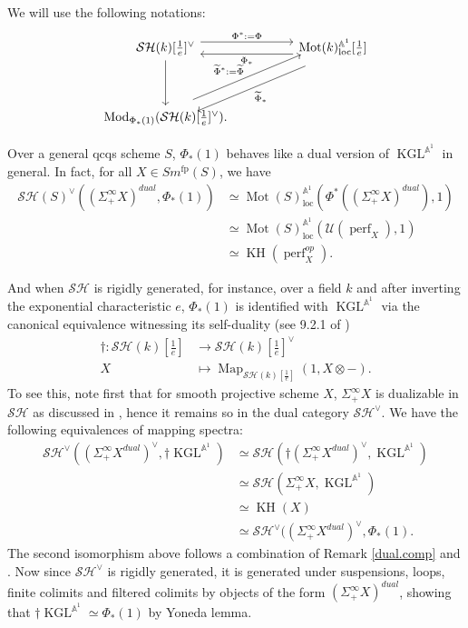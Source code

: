 \documentclass{article}
\theoremstyle{definition}
\newcommand{\on}{\operatorname}
\begin{document}
We will use the following notations:\[\begin{tikzcd}
	{\mathcal{SH}(k)[\frac{1}{e}]^{\vee}} && {\on{Mot}(k)_{\on{loc}}^{\mathbb{A}^1}[\frac{1}{e}]} \\
	\\
	{\on{Mod}_{\Phi_\ast(1)}(\mathcal{SH}(k)[\frac{1}{e}]^{\vee})}
	\arrow["{\Phi^\ast:=\Phi}", shift left=2, from=1-1, to=1-3]
	\arrow[from=1-1, to=3-1]
	\arrow["{\Phi_\ast}", shift left=2, from=1-3, to=1-1]
	\arrow["{\widetilde{\Phi}_\ast}", shift left=2, from=1-3, to=3-1]
	\arrow["{\widetilde{\Phi}^\ast:=\widetilde{\Phi}}", shift left=2, from=3-1, to=1-3].
\end{tikzcd}\]


Over a general qcqs scheme $S$, $\Phi_\ast(1)$ behaves like a dual version of $\on{KGL}^{\mathbb{A}^1}$ in general. In fact, for all $X\in Sm^{\on{fp}}(S)$, we have\[
\begin{aligned}
\mathcal{SH}(S)^{\vee}((\Sigma^\infty_+ X)^{dual},\Phi_\ast(1)) &\simeq \on{Mot}(S)_{\on{loc}}^{\mathbb{A}^1}(\Phi^\ast((\Sigma^\infty_+ X)^{dual}), 1)\\
&\simeq \on{Mot}(S)_{\on{loc}}^{\mathbb{A}^1}(\mathcal{U}(\on{perf}_X),1)\\
&\simeq\on{KH}(\on{perf}_X^{op}).
\end{aligned}\]


And when $\mathcal{SH}$ is rigidly generated, for instance, over a field $k$ and after inverting the exponential characteristic $e$, $\Phi_\ast(1)$ is identified with $\on{KGL}^{\mathbb{A}^1}$ via the canonical equivalence witnessing its self-duality (see 9.2.1 of \cite{GR})\[\begin{aligned}
\dagger:\mathcal{SH}(k)[\frac{1}{e}]&\rightarrow\mathcal{SH}(k)[\frac{1}{e}]^{\vee}\\
X&\mapsto\on{Map}_{\mathcal{SH}(k)[\frac{1}{e}]}(1,X\otimes-).
\end{aligned}
\]
To see this, note first that for smooth projective scheme $X$, $\Sigma^\infty_+X$ is dualizable in $\mathcal{SH}$ as discussed in \cite{Rio}, hence it remains so in the dual category $\mathcal{SH}^{\vee}$. We have the following equivalences of mapping spectra:
\[\begin{aligned}
\mathcal{SH}^\vee((\Sigma^\infty_+X^{dual})^\vee,\dagger\on{KGL}^{\mathbb{A}^1})&\simeq\mathcal{SH}(\dagger(\Sigma^\infty_+X^{dual})^\vee,\on{KGL}^{\mathbb{A}^1})\\
&\simeq\mathcal{SH}(\Sigma^\infty_+X,\on{KGL}^{\mathbb{A}^1})\\
&\simeq\on{KH}(X)\\
&\simeq\mathcal{SH}^\vee((\Sigma^\infty_+X^{dual})^\vee,\Phi_\ast(1).
\end{aligned}\]
The second isomorphism above follows a combination of Remark \ref{dual.comp} and \cite[Lemma 9.2.4]{GR}. Now since $\mathcal{SH}^\vee$ is rigidly generated, it is generated under suspensions, loops, finite colimits and filtered colimits by objects of the form $(\Sigma^\infty_+X)^{dual}$, showing that $\dagger\on{KGL}^{\mathbb{A}^1}\simeq\Phi_\ast(1)$ by Yoneda lemma.
\end{document}
